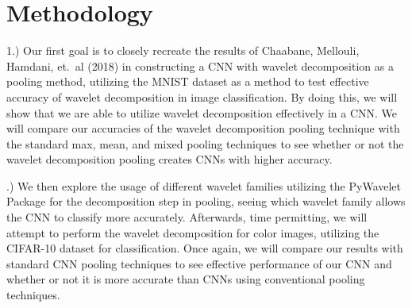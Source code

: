 \documentclass{article}
\begin{document}
\section{Methodology}
1.) Our first goal is to closely recreate the results of Chaabane, Mellouli, Hamdani, et.\ al (2018) in constructing a CNN with wavelet decomposition as a pooling method, utilizing the MNIST dataset as a method to test effective accuracy of wavelet decomposition in image classification. By doing this, we will show that we are able to utilize wavelet decomposition effectively in a CNN. We will compare our accuracies of the wavelet decomposition pooling technique with the standard max, mean, and mixed pooling techniques to see whether or not the wavelet decomposition pooling creates CNNs with higher accuracy. 
\newline

.) We then explore the usage of different wavelet families utilizing the PyWavelet Package for the decomposition step in pooling, seeing which wavelet family allows the CNN to classify more accurately.  Afterwards, time permitting, we will attempt to perform the wavelet decomposition for color images, utilizing the CIFAR-10 dataset for classification. Once again, we will compare our results with standard CNN pooling techniques to see effective performance of our CNN and whether or not it is more accurate than CNNs using conventional pooling techniques.
\end{document}
